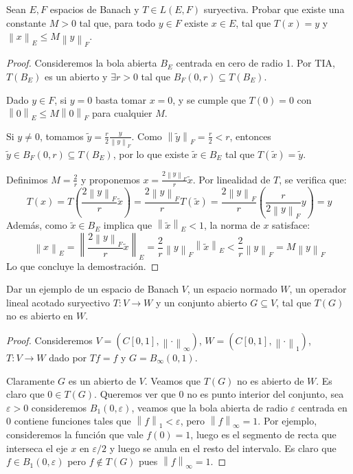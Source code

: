 \documentclass{article}
\theoremstyle{definition}
\newcommand{\norm}[1]{\left\lVert #1 \right\rVert}       %
\newenvironment{ejercicio}[1]{\begin{trivlist}
\item[\hskip \labelsep {\bfseries Ejercicio}\hskip \labelsep {\bfseries #1.}]}{\end{trivlist}}
\begin{document}
\begin{ejercicio}{7}
    Sean \(E, F\) espacios de Banach y \(T\in L(E,F)\) suryectiva. Probar que existe una constante \(M>0\) tal que, para todo \(y\in F\) existe \(x\in E\), tal que \(T(x)=y\) y \(\norm{x}_{E}\le M\norm{y}_{F}\).
\end{ejercicio}
\begin{proof}
    Consideremos la bola abierta \(B_E\) centrada en cero de radio 1. Por TIA, \(T(B_E)\) es un abierto y \(\exists r > 0\) tal que \(B_F(0, r) \subseteq T(B_E)\).

    Dado \(y \in F\), si \(y = 0\) basta tomar \(x = 0\), y se cumple que \(T(0) = 0\) con \(\norm{0}_E \le M \norm{0}_F\) para cualquier \(M\).

    Si \(y \neq 0\), tomamos \(\tilde y = \frac{r}{2} \frac{y}{\norm{y}_F}\). Como \(\norm{\tilde y}_F = \frac{r}{2} < r\), entonces \(\tilde y \in B_F(0, r) \subseteq T(B_E)\), por lo que existe \(\tilde x \in B_E\) tal que \(T(\tilde x) = \tilde y\).

    Definimos \(M = \frac{2}{r}\) y proponemos \(x = \frac{2\norm{y}_F}{r} \tilde x\). Por linealidad de \(T\), se verifica que:
    \[
        T(x) = T\left(\frac{2\norm{y}_F}{r} \tilde x\right) = \frac{2\norm{y}_F}{r} T(\tilde x) = \frac{2\norm{y}_F}{r} \left( \frac{r}{2\norm{y}_F} y \right) = y
    \]
    Además, como \(\tilde x \in B_E\) implica que \(\norm{\tilde x}_E < 1\), la norma de \(x\) satisface:
    \[
        \norm{x}_E = \norm{ \frac{2\norm{y}_F}{r} \tilde x }_E = \frac{2}{r} \norm{y}_F \norm{\tilde x}_E < \frac{2}{r} \norm{y}_F = M \norm{y}_F
    \]
    Lo que concluye la demostración.
\end{proof}

\vspace{0.5cm}

\begin{ejercicio}{8}
    Dar un ejemplo de un espacio de Banach \(V\), un espacio normado \(W\), un operador lineal acotado suryectivo \(T:V\to W\) y un conjunto abierto \(G\subseteq V\), tal que \(T(G)\) no es abierto en \(W\).
\end{ejercicio}
\begin{proof}
    Consideremos \( V = (C[0,1], \norm{\cdot}_{\infty}) \), \( W = (C[0,1],\norm{\cdot}_1) \), \(T:V\to W\) dado por \(Tf=f\) y \(G=B_{\infty}(0,1)\).

    Claramente \( G \) es un abierto de \( V \). Veamos que \(T(G)\) no es abierto de \( W \). Es claro que \( 0 \in T(G) \). Queremos ver que 0 no es punto interior del conjunto, sea \( \varepsilon > 0 \) consideremos \( B_{1}(0, \varepsilon) \), veamos que la bola abierta de radio \( \varepsilon \) centrada en 0 contiene funciones tales que \( \norm{f}_1 < \varepsilon \), pero \( \norm{f}_{\infty} = 1 \). Por ejemplo, consideremos la función que vale \( f(0) = 1 \), luego es el segmento de recta que interseca el eje \( x \) en \( \varepsilon / 2 \) y luego se anula en el resto del intervalo. Es claro que \( f \in B_1(0, \varepsilon) \) pero \( f \notin T(G) \) pues \( \norm{f}_{\infty} = 1 \).
\end{proof}
\end{document}

